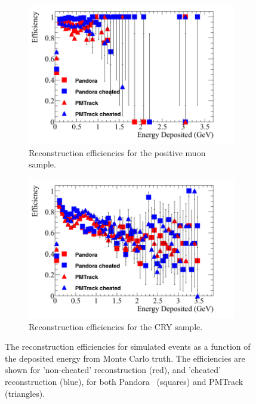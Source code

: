 \begin{figure}
  \centering
  \begin{subfigure}{0.48\textwidth}
    \centering
    \includegraphics[width=\textwidth]{Effic_AntiMuon_500V_All_EnDepos}
    \caption{Reconstruction efficiencies for the positive muon sample.}
    \label{fig:SimEffic_EnDepos_AMu}
  \end{subfigure}%
  \hspace{0.03\textwidth}%
  \begin{subfigure}{0.48\textwidth}
    \centering
    \includegraphics[width=\textwidth]{Effic_Cosmics_500V_All_EnDepos}
    \caption{Reconstruction efficiencies for the CRY sample.}
    \label{fig:SimEffic_EnDepos_CRY}
  \end{subfigure}
  \caption[The reconstruction efficiencies for simulated events as a function of the deposited energy from Monte Carlo truth.]
          {The reconstruction efficiencies for simulated events as a function of the deposited energy from Monte Carlo truth. The efficiencies are shown for 'non-cheated' reconstruction (red), and 'cheated' reconstruction (blue), for both Pandora~\citep{Pandora} (squares) and PMTrack~\citep{PMTrack} (triangles).}
          \label{fig:SimEffic_EnDepos}
\end{figure}

